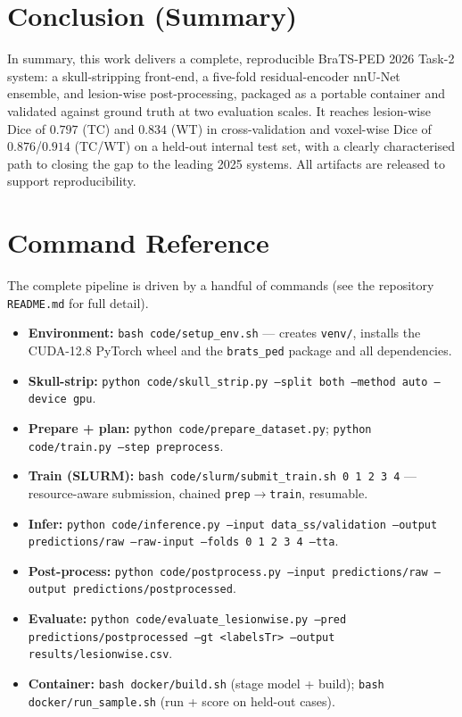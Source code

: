 \documentclass[11pt,a4paper]{article}
\begin{document}
\section{Conclusion (Summary)}
In summary, this work delivers a complete, reproducible BraTS-PED 2026 Task-2 system:
a skull-stripping front-end, a five-fold residual-encoder nnU-Net ensemble, and
lesion-wise post-processing, packaged as a portable container and validated against
ground truth at two evaluation scales. It reaches lesion-wise Dice of $0.797$ (TC)
and $0.834$ (WT) in cross-validation and voxel-wise Dice of $0.876$/$0.914$ (TC/WT)
on a held-out internal test set, with a clearly characterised path to closing the gap
to the leading 2025 systems. All artifacts are released to support reproducibility.

\appendix
\section{Command Reference}
\label{app:cmd}
The complete pipeline is driven by a handful of commands (see the repository
\texttt{README.md} for full detail).
\begin{itemize}[leftmargin=1.4em,itemsep=2pt]
  \item \textbf{Environment:} \texttt{bash code/setup\_env.sh} --- creates
        \texttt{venv/}, installs the CUDA-12.8 PyTorch wheel and the \texttt{brats\_ped}
        package and all dependencies.
  \item \textbf{Skull-strip:} \texttt{python code/skull\_strip.py --split both
        --method auto --device gpu}.
  \item \textbf{Prepare + plan:} \texttt{python code/prepare\_dataset.py};
        \texttt{python code/train.py --step preprocess}.
  \item \textbf{Train (SLURM):} \texttt{bash code/slurm/submit\_train.sh 0 1 2 3 4}
        --- resource-aware submission, chained \texttt{prep$\to$train}, resumable.
  \item \textbf{Infer:} \texttt{python code/inference.py --input data\_ss/validation
        --output predictions/raw --raw-input --folds 0 1 2 3 4 --tta}.
  \item \textbf{Post-process:} \texttt{python code/postprocess.py --input
        predictions/raw --output predictions/postprocessed}.
  \item \textbf{Evaluate:} \texttt{python code/evaluate\_lesionwise.py --pred
        predictions/postprocessed --gt <labelsTr> --output results/lesionwise.csv}.
  \item \textbf{Container:} \texttt{bash docker/build.sh} (stage model + build);
        \texttt{bash docker/run\_sample.sh} (run + score on held-out cases).
\end{itemize}
\end{document}
